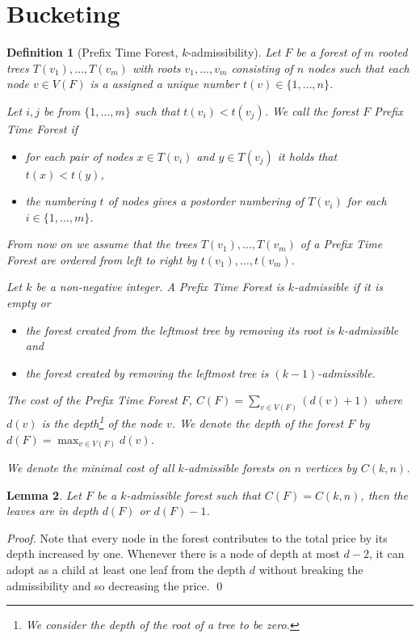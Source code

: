 \documentclass{llncs}
\newtheorem{definition}{Definition} %
\newtheorem{lemma}[definition]{Lemma}
\newcommand{\optPrice}[2]{C\left(#1, #2\right)}
\begin{document}
\section{Bucketing}
\label{sec:bucketing}

\begin{definition}[Prefix Time Forest, $k$-admissibility]
\label{def:ptf}
Let $F$ be a forest of $m$ rooted trees $T(v_1), \dots, T(v_m)$ with roots $v_1,\ldots, v_m$ consisting of $n$ nodes such that each node $v \in V(F)$ is a assigned a unique number $t(v) \in \{1, \dots, n\}$.

Let $i, j$ be from $\{1, \dots, m\}$ such that $t(v_i) < t(v_j)$.
We call the forest $F$ \emph{Prefix Time Forest} if
\begin{itemize}
	\item for each pair of nodes $x \in T({v_i})$ and $y \in T({v_j})$ it holds that $t(x) < t(y)$,
	\item the numbering $t$ of nodes gives a postorder numbering of $T(v_i)$  for each $i \in \{1, \dots, m\}$.
\end{itemize}

From now on we assume that the trees $T(v_1), \dots, T(v_m)$ of a Prefix Time Forest are ordered from left to right by $t(v_1), \dots, t(v_m)$.

Let $k$ be a non-negative integer. A Prefix Time Forest is \emph{$k$-admissible} if it is empty or
\begin{itemize}
\item the forest created from the leftmost tree by removing its root is $k$-admissible and
\item the forest created by removing the leftmost tree is $(k - 1)$-admissible.
\end{itemize}

The cost of the Prefix Time Forest $F$, $C(F) = \sum_{v\in V(F)} (d(v) + 1)$ where $d(v)$ is the depth\footnote{We consider the depth of the root of a tree to be zero.} of the node $v$. We denote the depth of the forest $F$ by $d(F) = \max_{v \in V(F)} d(v)$.

We denote the minimal cost of all $k$-admissible forests on $n$ vertices by $\optPrice{k}{n}$.
\end{definition}

\begin{lemma}
\label{lm:optimal-price-depth}
Let $F$ be a $k$-admissible forest such that $C(F) = \optPrice{k}{n}$, then the leaves are in depth $d(F)$ or $d(F) - 1$.
\end{lemma}
\begin{proof}
Note that every node in the forest contributes to the total price by its depth increased by one.
Whenever there is a node of depth at most $d-2$, it can adopt as a child at least one leaf from the depth $d$ without breaking the admissibility and so decreasing the price.
\qed
\end{proof}
\end{document}
